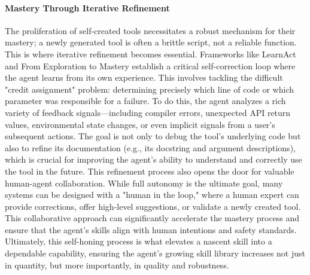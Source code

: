\documentclass[10pt]{article} %
\begin{document}
\paragraph{Mastery Through Iterative Refinement}
The proliferation of self-created tools necessitates a robust mechanism for their mastery; a newly generated tool is often a brittle script, not a reliable function. This is where iterative refinement becomes essential. Frameworks like LearnAct and From Exploration to Mastery establish a critical self-correction loop where the agent learns from its own experience\citep{zhao2024learnact, fromexplorationtomastery}. This involves tackling the difficult "credit assignment" problem: determining precisely which line of code or which parameter was responsible for a failure. To do this, the agent analyzes a rich variety of feedback signals—including compiler errors, unexpected API return values, environmental state changes, or even implicit signals from a user's subsequent actions. The goal is not only to debug the tool's underlying code but also to refine its documentation (e.g., its docstring and argument descriptions), which is crucial for improving the agent's ability to understand and correctly use the tool in the future.
This refinement process also opens the door for valuable human-agent collaboration. While full autonomy is the ultimate goal, many systems can be designed with a "human in the loop," where a human expert can provide corrections, offer high-level suggestions, or validate a newly created tool. This collaborative approach can significantly accelerate the mastery process and ensure that the agent's skills align with human intentions and safety standards. Ultimately, this self-honing process is what elevates a nascent skill into a dependable capability, ensuring the agent's growing skill library increases not just in quantity, but more importantly, in quality and robustness.
\end{document}
